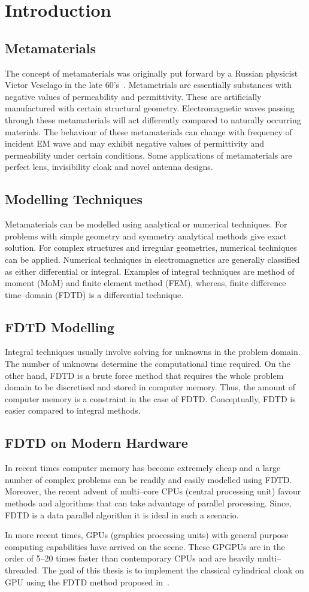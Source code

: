 \chapter{Introduction}
\section{Metamaterials}
The concept of metamaterials was originally put forward by a Russian physicist Victor Veselago in the late 60's~\cite{Newelectronics-Metamaterial}. Metametrials are essentially substances with negative values of permeability and permittivity. These are artificially manufactured with certain structural geometry. Electromagnetic waves passing through these metamaterials will act differently compared to naturally occurring materials. The behaviour of these metamaterials can change with frequency of incident EM wave and may exhibit negative values of permittivity and permeability under certain conditions. Some applications of metamaterials are perfect lens, invisibility cloak and novel antenna designs.
\section{Modelling Techniques}
Metamaterials can be modelled using analytical or numerical techniques. For problems with simple geometry and symmetry analytical methods give exact solution. For complex structures and irregular geometries, numerical techniques can be applied. Numerical techniques in electromagnetics are generally classified as either differential or integral. Examples of integral techniques are method of moment (MoM) and finite element method (FEM), whereas, finite difference time--domain (FDTD) is a differential technique.
\section{FDTD Modelling}
Integral techniques usually involve solving for unknowns in the problem domain. The number of unknowns determine the computational time required. On the other hand, FDTD is a brute force method that requires the whole problem domain to be discretised and stored in computer memory. Thus, the amount of computer memory is a constraint in the case of FDTD. Conceptually, FDTD is easier compared to integral methods.
\section{FDTD on Modern Hardware}
In recent times computer memory has become extremely cheap and a large number of complex problems can be readily and easily modelled using FDTD. Moreover, the recent advent of multi--core CPUs (central processing unit) favour methods and algorithms that can take advantage of parallel processing. Since, FDTD is a data parallel algorithm it is ideal in such a scenario.

In more recent times, GPUs (graphics processing units) with general purpose computing capabilities have arrived on the scene. These GPGPUs are in the order of 5--20 times faster than contemporary CPUs and are heavily multi--threaded. The goal of this thesis is to implement the classical cylindrical cloak on GPU using the FDTD method proposed in~\cite{Radial-Zhao}.
